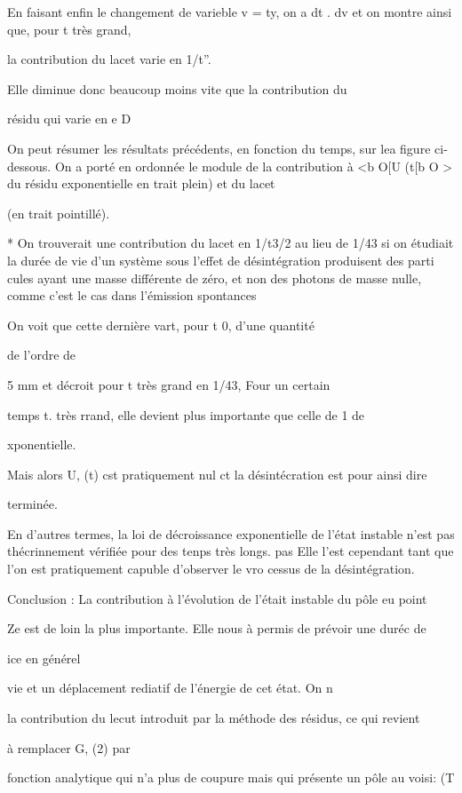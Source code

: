 
En faisant enfin le changement de varieble v = ty, on a
 dt  .
 dv et on montre ainsi que, pour t très grand,

la contribution du lacet varie en 1/t”.

Elle diminue donc beaucoup moins vite que la contribution du

résidu qui varie en e D

On peut résumer les résultats précédents, en fonction du temps,
sur lea figure ci-dessous. On a porté en ordonnée le module de la contribution
à <b O[U (t[b O > du résidu exponentielle en trait plein) et du lacet

(en trait pointillé).


* On trouverait une contribution du lacet en 1/t3/2 au lieu de 1/43 si on étudiait
la durée de vie d'un système sous l'effet de désintégration produisent des parti
cules ayant une masse différente de zéro, et non des photons de masse nulle, comme
c'est le cas dans l'émission spontances

On voit que cette dernière vart, pour t  0, d'une quantité

de l'ordre de 

5 mm et décroit pour t très grand en 1/43, Four un certain

temps t. très rrand, elle devient plus importante que celle de 1
 de

xponentielle.

Mais alors U, (t) cst pratiquement nul ct la désintécration est pour ainsi dire

terminée.

En d'autres termes, la loi de décroissance exponentielle de
l'état instable n'est pas thécrinnement vérifiée pour des tenps très longs.
pas
Elle l'est cependant tant que l'on est pratiquement capuble d'observer le vro
cessus de la désintégration.

Conclusion : La contribution à l'évolution de l'était instable du pôle eu point

Ze est de loin la plus importante. Elle nous à permis de prévoir une duréc de

ice en générel

vie et un déplacement rediatif de l'énergie de cet état. On n

la contribution du lecut introduit par la méthode des résidus, ce qui revient

à remplacer G, (2) par


fonction analytique qui n'a plus de coupure mais qui présente un pôle au voisi: (T


